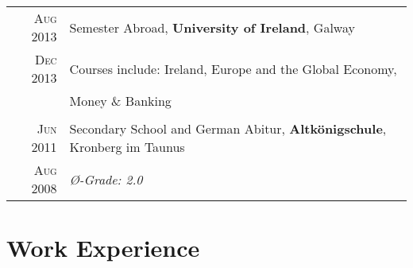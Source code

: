 \documentclass[a4paper,10pt]{article} %
\begin{document}
\begin{tabular}{rl}

\textsc{Aug 2013} & Semester Abroad, \textbf{University of Ireland}, Galway\\
\textsc{Dec 2013} & \footnotesize{Courses include: Ireland, Europe and the Global Economy,}\\
& \footnotesize{Money \& Banking} \\
&\\

\textsc{Jun 2011} & Secondary School and German Abitur, \textbf{Altkönigschule}, Kronberg im Taunus\\
\textsc{Aug 2008}& \emph{{\O}-Grade: 2.0}\\

\end{tabular}


\section{Work Experience}
\end{document}
